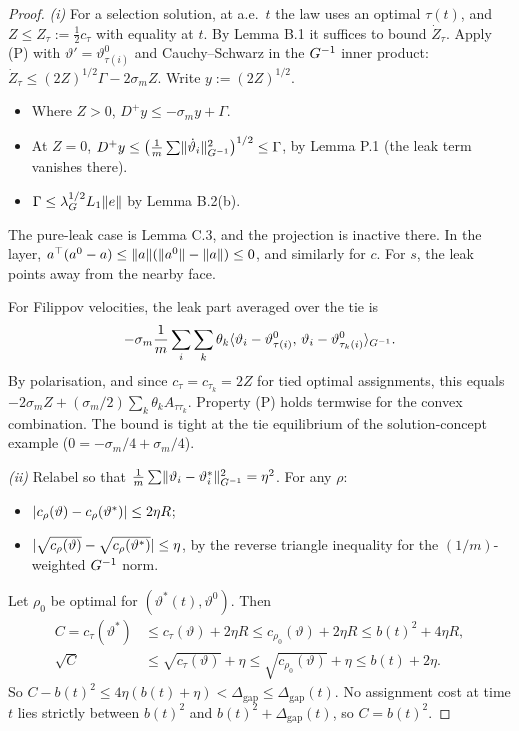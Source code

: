\begin{proof}
\textit{(i)} For a selection solution, at a.e.\ $t$ the law uses an optimal $\tau(t)$, and
$Z \le Z_\tau := \frac12 c_\tau$ with equality at $t$. By Lemma B.1 it suffices to bound $\dot Z_\tau$. Apply (P)
with $\vartheta' = \vartheta^0_{\tau(i)}$ and Cauchy--Schwarz in the $G^{-1}$ inner product:
$\dot Z_\tau \le (2Z)^{1/2}\Gamma - 2\sigma_m Z$. Write $y := (2Z)^{1/2}$.
\begin{itemize}
  \item Where $Z>0$, $D^+y \le -\sigma_m y + \Gamma$.
  \item At $Z = 0$, $D^+y \le \bigl(\frac1m\sum\lVert \dot\vartheta_i\rVert^2_{G^{-1}}\bigr)^{1/2} \le \Gamma$, by
    Lemma P.1 (the leak term vanishes there).
  \item $\Gamma \le \lambda_G^{1/2}L_1\lVert e\rVert$ by Lemma B.2(b).
\end{itemize}
The pure-leak case is Lemma C.3, and the projection is inactive there. In the layer,
$a^\top(a^0 - a) \le \lVert a\rVert(\lVert a^0\rVert - \lVert a\rVert) \le 0$, and similarly for $c$. For $s$, the leak points away
from the nearby face.

For Filippov velocities, the leak part averaged over the tie is
\[
  -\sigma_m\frac1m\sum_i\sum_k\theta_k\langle \vartheta_i - \vartheta^0_{\tau(i)},\, \vartheta_i -
  \vartheta^0_{\tau_k(i)}\rangle_{G^{-1}}.
\]
By polarisation, and since $c_\tau = c_{\tau_k} = 2Z$ for tied optimal assignments, this equals
$-2\sigma_m Z + (\sigma_m/2)\sum_k\theta_k A_{\tau\tau_k}$. Property (P) holds termwise for the convex combination.
The bound is tight at the tie equilibrium of the solution-concept example ($0 = -\sigma_m/4 + \sigma_m/4$).

\smallskip
\textit{(ii)} Relabel so that $\frac1m\sum\lVert \vartheta_i - \vartheta^*_i\rVert^2_{G^{-1}} = \eta^2$. For any $\rho$:
\begin{itemize}
  \item $\lvert c_\rho(\vartheta) - c_\rho(\vartheta^*)\rvert \le 2\eta R$;
  \item $\lvert \sqrt{c_\rho(\vartheta)} - \sqrt{c_\rho(\vartheta^*)}\rvert \le \eta$, by the reverse triangle inequality
    for the $(1/m)$-weighted $G^{-1}$ norm.
\end{itemize}
Let $\rho_0$ be optimal for $(\vartheta^*(t),\vartheta^0)$. Then
\begin{align*}
  C = c_\tau(\vartheta^*) &\le c_\tau(\vartheta) + 2\eta R \le c_{\rho_0}(\vartheta) + 2\eta R
    \le b(t)^2 + 4\eta R,\\
  \sqrt{C} &\le \sqrt{c_\tau(\vartheta)} + \eta \le \sqrt{c_{\rho_0}(\vartheta)} + \eta \le b(t) + 2\eta.
\end{align*}
So $C - b(t)^2 \le 4\eta(b(t)+\eta) < \Delta_{\mathrm{gap}} \le \Delta_{\mathrm{gap}}(t)$. No assignment cost at
time $t$ lies strictly between $b(t)^2$ and $b(t)^2 + \Delta_{\mathrm{gap}}(t)$, so $C = b(t)^2$.


\end{proof}

